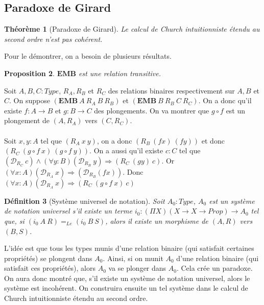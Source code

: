 \documentclass[a4paper,12pt]{article}
\theoremstyle{plain}
\newtheorem{theo}{Théorème}[subsection]
\newtheorem{prop}[theo]{Proposition}
\newtheorem{defi}[theo]{Définition}
\newenvironment{demo}[1][]
 {\if\relax\detokenize{#1}\relax
    \renewcommand\theproofinner{\thetheo}%
  \else
    \renewcommand{\theproofinner}{#1}%
  \fi
  \proofinner}
 {\endproofinner}
\begin{document}
\subsection{Paradoxe de Girard}

\begin{theo}[Paradoxe de Girard]
Le calcul de Church intuitionniste étendu au second ordre n'est pas cohérent.
\end{theo}

Pour le démontrer, on a besoin de plusieurs résultats.

\begin{prop}
$\mathbf{EMB}$ est une relation transitive.
\end{prop}

\begin{demo} Soit $A, B, C: \mathit{Type}$,
$R_A, R_B$ et $R_C $ des relations binaires respectivement sur $A,B$ et $C$. On suppose $(\mathbf{EMB}\ A \ R_A \ B \ R_B )$ et $( \mathbf{EMB}\ B  \ R_B \ C \ R_C )$. On a donc qu'il existe $f : A \to B$ et $g : B \to C$ des plongements. On va montrer que $g {\circ} f$ est un plongement de $(A, R_A)$ vers $(C, R_C)$.\\ 
\\ 
Soit $x,y : A$ tel que $(R_A \ x \ y)$, on a donc $(R_B \ (f x) \ (f y))$ et donc $(R_C \ (g {\circ} f \ x) \ (g {\circ} f \ y))$. On a aussi qu'il existe $c:C$ tel que $(\mathcal{D}_{R_C} \ c) \land (\forall y : B) (\mathcal{D}_{R_B} \ y) \Rightarrow(R_C \ (gy) \ c)$. Or $(\forall x : A) (\mathcal{D}_{R_A} \ x) \Rightarrow(\mathcal{D}_{R_B} (fx))$. Donc $(\forall x : A) (\mathcal{D}_{R_A} \ x) \Rightarrow(R_C \ (g {\circ} f \ x) \ c)$
\end{demo}

\begin{defi}[Système universel de notation]
Soit $A_0 : \mathit{Type}$, $A_0$ est un système de notation universel s'il existe un terme $i_0 : (\Pi X)(X \to X \to \mathit{Prop}) \to A_0$ tel que, si $(i_0 \ A \ R) =_{\mathit{Le}}(i_0 \ B \ S)$, alors il existe un morphisme de $(A,R)$ vers $(B,S)$.
\end{defi}

L'idée est que tous les types munis d'une relation binaire (qui satisfait certaines propriétés) se plongent dans $A_0$. Ainsi, si on munit $A_0$ d'une relation binaire (qui satisfait ces propriétés), alors $A_0$ va se plonger dans $A_0$. Cela crée un paradoxe. On aura donc montré que, s'il existe un système de notation universel, alors le système est incohérent. On construira ensuite un tel système dans le calcul de Church intuitionniste étendu au second ordre.\\
\end{document}
